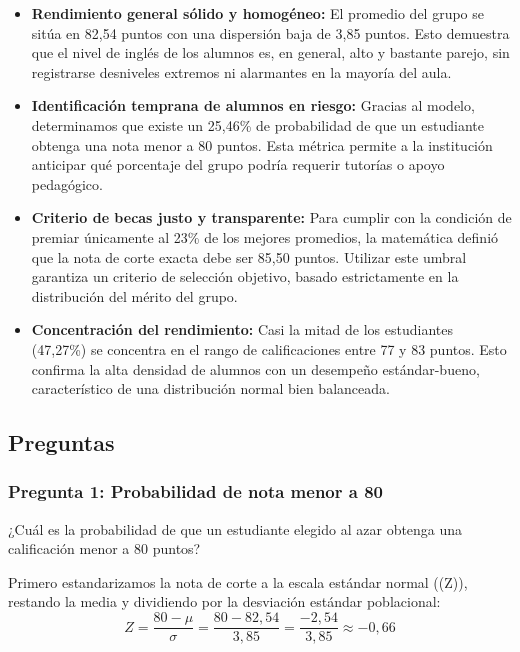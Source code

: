 \begin{itemize}
	\item \textbf{Rendimiento general sólido y homogéneo:} El promedio del grupo se sitúa en
	82,54 puntos con una dispersión baja de 3,85 puntos. Esto demuestra que el nivel de inglés de
	los alumnos es, en general, alto y bastante parejo, sin registrarse desniveles extremos ni
	alarmantes en la mayoría del aula.
	\item \textbf{Identificación temprana de alumnos en riesgo:} Gracias al modelo, determinamos
	que existe un 25,46\% de probabilidad de que un estudiante obtenga una nota menor a 80
	puntos. Esta métrica permite a la institución anticipar qué porcentaje del grupo podría
	requerir tutorías o apoyo pedagógico.
	\item \textbf{Criterio de becas justo y transparente:} Para cumplir con la condición de
	premiar únicamente al 23\% de los mejores promedios, la matemática definió que la nota de
	corte exacta debe ser 85,50 puntos. Utilizar este umbral garantiza un criterio de selección
	objetivo, basado estrictamente en la distribución del mérito del grupo.
	\item \textbf{Concentración del rendimiento:} Casi la mitad de los estudiantes (47,27\%) se
	concentra en el rango de calificaciones entre 77 y 83 puntos. Esto confirma la alta densidad
	de alumnos con un desempeño estándar-bueno, característico de una distribución normal bien
	balanceada.
\end{itemize}

\AnalisisDescriptivo



\subsection{Preguntas}

\subsubsection{Pregunta 1: Probabilidad de nota menor a 80}

¿Cuál es la probabilidad de que un estudiante elegido al azar obtenga una calificación menor a
80 puntos?

Primero estandarizamos la nota de corte a la escala estándar normal ((Z)), restando la media y
dividiendo por la desviación estándar poblacional:
\begin{equation*}
  Z = \frac{80 - \mu}{\sigma} = \frac{80 - 82{,}54}{3{,}85} = \frac{-2{,}54}{3{,}85} \approx -0{,}66
\end{equation*}

